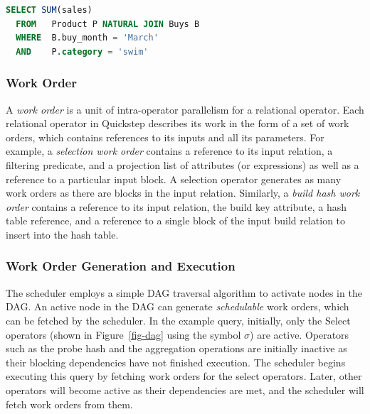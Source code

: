 \begin{lstlisting}[language=SQL,upquote=true,
basicstyle=\ttfamily\small,
showstringspaces=false,
keywordstyle=\color{cardinal}\bfseries,
emphstyle=\color{bondiblue}\bfseries,
stringstyle=\color{bondiblue}\bfseries,
emph={SUM}]
  SELECT SUM(sales)
  FROM   Product P NATURAL JOIN Buys B
  WHERE  B.buy_month = 'March'
  AND    P.category = 'swim'
\end{lstlisting}

\subsubsection{Work Order}

A \textit{work order} is a unit of intra-operator parallelism for a relational operator. Each relational operator in Quickstep describes its work in the form of a set of work orders, which contains references to its inputs and all its parameters.
For example, a \textit{selection work order} contains a reference to its input relation, a filtering predicate, and a projection list of attributes (or expressions) as well as a reference to a particular input block. A selection operator generates as many work orders as there are blocks in the input relation. Similarly, a \textit{build hash work order} contains a reference to its input relation, the build key attribute, a hash table reference, and a reference to a single block of the input build relation to insert into the hash table.

\subsubsection{Work Order Generation and Execution}

The scheduler employs a simple DAG traversal algorithm to activate nodes in the DAG.
An active node in the DAG can generate \textit{schedulable} work orders, which can be fetched by the scheduler.
In the example query, initially, only the Select operators (shown in Figure~\ref{fig-dag} using the symbol $\sigma$) are active. Operators such as the probe hash and the aggregation operations are initially inactive as their blocking dependencies have not finished execution.
The scheduler begins executing this query by fetching work orders for the select operators. Later, other operators will become active as their dependencies are met, and the  scheduler will fetch work orders from them.

